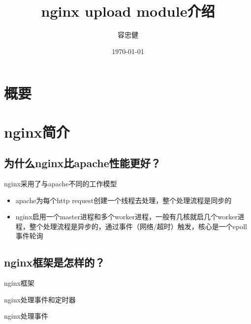 \documentclass[aspectratio=169]{ctexbeamer}
\title{nginx upload module介绍}
\author{容忠健}
\institute{@Bigo}
\date{\today}
\begin{document}
\frame[plain]{\titlepage}

\section*{概要}
\begin{frame}
  \tableofcontents[hideallsubsections]
\end{frame}

\section{nginx简介}

\subsection{为什么nginx比apache性能更好？}
\begin{frame}{\subsecname}{nginx采用了与apache不同的工作模型}
  \begin{itemize}
  \item<2-> apache为每个http request创建一个线程去处理，整个处理流程是同步的
  \item<3-> nginx启用一个master进程和多个worker进程，一般有几核就启几个worker进程，整个处理流程是异步的，通过事件（网络/超时）触发，核心是一个epoll事件轮询
  \end{itemize}
\end{frame}

\subsection{nginx框架是怎样的？}

\begin{frame}{\subsecname}{nginx框架}
  
\end{frame}

\begin{frame}{\subsecname}{nginx处理事件和定时器}
  
\end{frame}

\begin{frame}{\subsecname}{nginx处理事件}
  
\end{frame}
\end{document}
